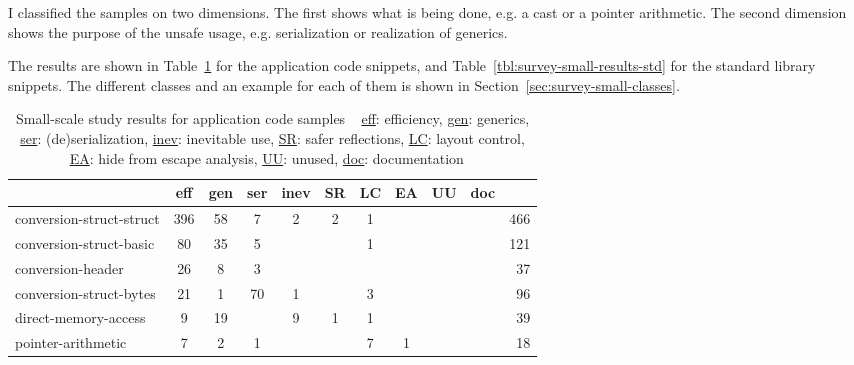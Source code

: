 I classified the samples on two dimensions.
The first shows what is being done, e.g. a cast or a pointer arithmetic.
The second dimension shows the purpose of the unsafe usage, e.g. serialization or realization of generics.

The results are shown in Table~\ref{tbl:survey-small-results-app} for the application code snippets, and
Table~\ref{tbl:survey-small-results-std} for the standard library snippets.
The different classes and an example for each of them is shown in Section~\ref{sec:survey-small-classes}.

\begin{table}[h]
    \centering
    \caption[Small-scale study results for application code samples]%
    {Small-scale study results for application code samples \newline \tiny ~ \newline \small
        \underline{eff}: efficiency, \underline{gen}: generics, \underline{ser}: (de)serialization,
        \underline{inev}: inevitable use, \underline{SR}: safer reflections, \underline{LC}: layout control,
        \underline{EA}: hide from escape analysis, \underline{UU}: unused,
        \underline{doc}: documentation \newline \tiny ~}
    \label{tbl:survey-small-results-app}
    \begin{tabularx}{\textwidth}{Xccccccccc|r}
        \toprule
                                          &  eff &  gen & ser & inev &  SR &  LC &  EA &  UU & doc &  {}   \\
        \midrule
                 conversion-struct-struct &  396 &   58 &   7 &    2 &   2 &   1 &    &     &     &   466 \\
        \rowcolor{verylightgray}
                  conversion-struct-basic &   80 &   35 &   5 &      &     &   1 &    &     &     &   121 \\
                        conversion-header &   26 &    8 &   3 &      &     &     &    &     &     &    37 \\
        \rowcolor{verylightgray}
                  conversion-struct-bytes &   21 &    1 &  70 &    1 &     &   3 &    &     &     &    96 \\
                     direct-memory-access &    9 &   19 &     &    9 &   1 &   1 &    &     &     &    39 \\
        \rowcolor{verylightgray}
                       pointer-arithmetic &    7 &    2 &   1 &      &     &   7 &  1 &     &     &    18 \\

\end{tabularx}
\end{table}
